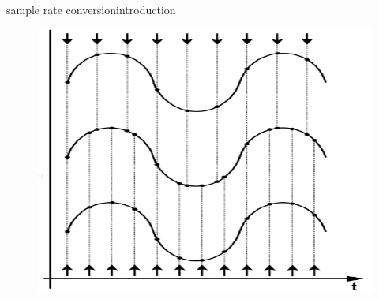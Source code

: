 	\begin{frame}{sample rate conversion}{introduction}
		\begin{figure}
            \includegraphics[scale=0.4]{Graph/src_interpolation}
		\end{figure}
    \end{frame}
